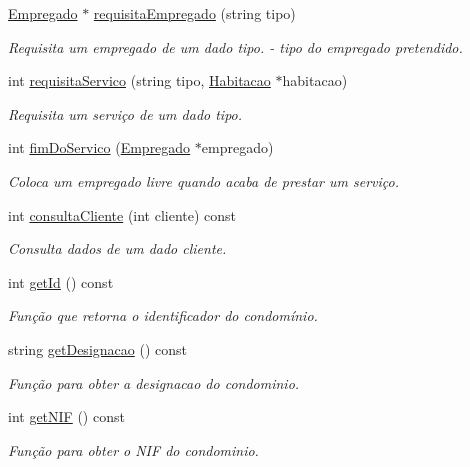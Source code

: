 \begin{DoxyCompactItemize}
\hyperlink{class_empregado}{Empregado} $\ast$ \hyperlink{class_condominio_a5eec0c5c3a1cb566332431939bcbcb56}{requisita\+Empregado} (string tipo)
\begin{DoxyCompactList}\small\item\em Requisita um empregado de um dado tipo.  -\/ tipo do empregado pretendido. \end{DoxyCompactList}\item 
int \hyperlink{class_condominio_adb5c91a9114dbc1c0f3c8c3e9f835152}{requisita\+Servico} (string tipo, \hyperlink{class_habitacao}{Habitacao} $\ast$habitacao)
\begin{DoxyCompactList}\small\item\em Requisita um serviço de um dado tipo. \end{DoxyCompactList}\item 
int \hyperlink{class_condominio_af2c2cdd83d43ea6641542efe01ff94b9}{fim\+Do\+Servico} (\hyperlink{class_empregado}{Empregado} $\ast$empregado)
\begin{DoxyCompactList}\small\item\em Coloca um empregado livre quando acaba de prestar um serviço. \end{DoxyCompactList}\item 
int \hyperlink{class_condominio_abfbd356bc26fde54dc40de2f9174f430}{consulta\+Cliente} (int cliente) const 
\begin{DoxyCompactList}\small\item\em Consulta dados de um dado cliente. \end{DoxyCompactList}\item 
int \hyperlink{class_condominio_a37df336e62f83189d9193f039e58935d}{get\+Id} () const 
\begin{DoxyCompactList}\small\item\em Função que retorna o identificador do condomínio. \end{DoxyCompactList}\item 
string \hyperlink{class_condominio_a1c9390d8d9fcfe834568d74041a49e04}{get\+Designacao} () const 
\begin{DoxyCompactList}\small\item\em Função para obter a designacao do condominio. \end{DoxyCompactList}\item 
int \hyperlink{class_condominio_a131891ab8b9ca504227ec3f9edcbc326}{get\+N\+IF} () const 
\begin{DoxyCompactList}\small\item\em Função para obter o N\+IF do condominio. \end{DoxyCompactList}\item 

\end{DoxyCompactItemize}
